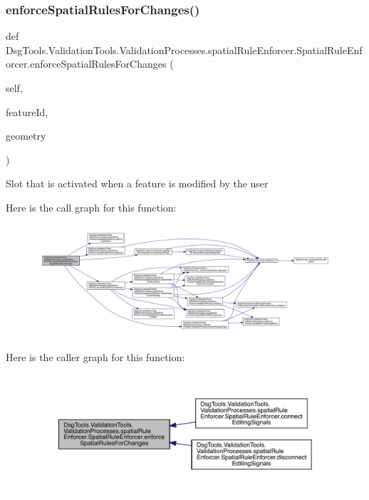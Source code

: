 \subsubsection{\texorpdfstring{enforce\+Spatial\+Rules\+For\+Changes()}{enforceSpatialRulesForChanges()}}
{\footnotesize\ttfamily def Dsg\+Tools.\+Validation\+Tools.\+Validation\+Processes.\+spatial\+Rule\+Enforcer.\+Spatial\+Rule\+Enforcer.\+enforce\+Spatial\+Rules\+For\+Changes (\begin{DoxyParamCaption}\item[{}]{self,  }\item[{}]{feature\+Id,  }\item[{}]{geometry }\end{DoxyParamCaption})}

\begin{DoxyVerb}Slot that is activated when a feature is modified by the user
\end{DoxyVerb}
 Here is the call graph for this function\+:
\nopagebreak
\begin{figure}[H]
\begin{center}
\leavevmode
\includegraphics[width=350pt]{class_dsg_tools_1_1_validation_tools_1_1_validation_processes_1_1spatial_rule_enforcer_1_1_spatial_rule_enforcer_aa03241b2175d5c8a4027555f5624b965_cgraph}
\end{center}
\end{figure}
Here is the caller graph for this function\+:
\nopagebreak
\begin{figure}[H]
\begin{center}
\leavevmode
\includegraphics[width=350pt]{class_dsg_tools_1_1_validation_tools_1_1_validation_processes_1_1spatial_rule_enforcer_1_1_spatial_rule_enforcer_aa03241b2175d5c8a4027555f5624b965_icgraph}
\end{center}
\end{figure}

